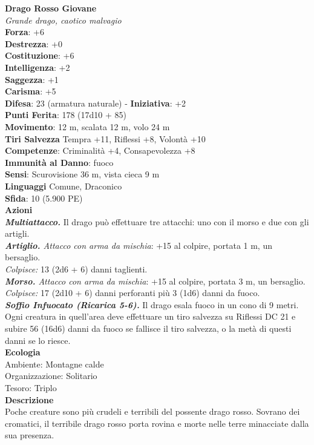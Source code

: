 \begin{multicols}{2}
\medskip\textbf{Drago Rosso Giovane}\\
\emph{Grande drago, caotico malvagio}\\
\textbf{Forza}: +6\\
\textbf{Destrezza}: +0\\
\textbf{Costituzione}: +6\\
\textbf{Intelligenza}: +2\\
\textbf{Saggezza}: +1\\
\textbf{Carisma}: +5\\
\textbf{Difesa}: 23 (armatura naturale) - \textbf{Iniziativa}: +2\\
\textbf{Punti Ferita}: 178 (17d10 + 85)\\
\textbf{Movimento}: 12 m, scalata 12 m, volo 24 m\\
\textbf{Tiri Salvezza} Tempra +11, Riflessi +8, Volontà +10\\
\textbf{Competenze}: Criminalità +4, Consapevolezza +8\\
\textbf{Immunità al Danno}: fuoco\\
\textbf{Sensi}: Scurovisione 36 m, vista cieca 9 m\\
\textbf{Linguaggi} Comune, Draconico\\
\textbf{Sfida}: 10 (5.900 PE)\smallskip\\
\smallskip\textbf{Azioni}\\
\emph{\textbf{Multiattacco.}} Il drago può effettuare tre attacchi: uno con il morso e due con gli artigli.\\
\emph{\textbf{Artiglio.} Attacco con arma da mischia}: +15 al colpire, portata 1 m, un bersaglio.\\
\emph{Colpisce:} 13 (2d6 + 6) danni taglienti. \\
\emph{\textbf{Morso.} Attacco con arma da mischia}: +15 al colpire, portata 3 m, un bersaglio.\\
\emph{Colpisce:} 17 (2d10 + 6) danni perforanti più 3 (1d6) danni da fuoco.\\
\emph{\textbf{Soffio Infuocato (Ricarica 5-6).}} Il drago esala fuoco in un cono di 9 metri. Ogni creatura in quell'area deve effettuare un tiro salvezza su Riflessi DC  21 e subire 56 (16d6) danni da fuoco se fallisce il tiro salvezza, o la metà di questi danni se lo riesce.\\
\textbf{Ecologia}\\
Ambiente: Montagne calde\\
Organizzazione: Solitario\\
Tesoro: Triplo\\
\textbf{Descrizione}\\
Poche creature sono più crudeli e terribili del possente drago rosso. Sovrano dei cromatici, il terribile drago rosso porta rovina e morte nelle terre minacciate dalla sua presenza.\\


\end{multicols}
